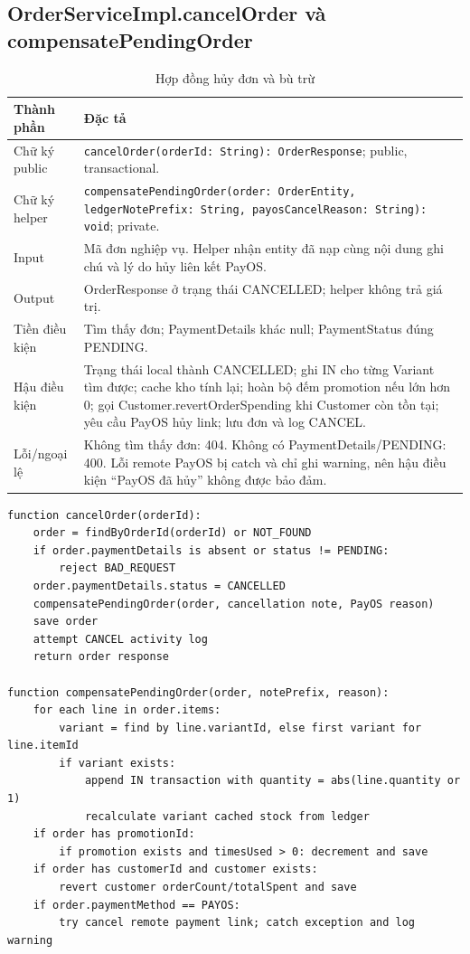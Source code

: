 \documentclass[12pt,a4paper,oneside]{report}
\begin{document}
\subsection{OrderServiceImpl.cancelOrder và compensatePendingOrder}
\begin{table}[htbp]
\centering\small
\caption{Hợp đồng hủy đơn và bù trừ}
\begin{tabularx}{\textwidth}{@{}p{3.1cm}Y@{}}\toprule
Thành phần & Đặc tả\\\midrule
Chữ ký public & \texttt{cancelOrder(orderId: String): OrderResponse}; public, transactional.\\
Chữ ký helper & \texttt{compensatePendingOrder(order: OrderEntity, ledgerNotePrefix: String, payosCancelReason: String): void}; private.\\
Input & Mã đơn nghiệp vụ. Helper nhận entity đã nạp cùng nội dung ghi chú và lý do hủy liên kết PayOS.\\
Output & OrderResponse ở trạng thái CANCELLED; helper không trả giá trị.\\
Tiền điều kiện & Tìm thấy đơn; PaymentDetails khác null; PaymentStatus đúng PENDING.\\
Hậu điều kiện & Trạng thái local thành CANCELLED; ghi IN cho từng Variant tìm được; cache kho tính lại; hoàn bộ đếm promotion nếu lớn hơn 0; gọi Customer.revertOrderSpending khi Customer còn tồn tại; yêu cầu PayOS hủy link; lưu đơn và log CANCEL.\\
Lỗi/ngoại lệ & Không tìm thấy đơn: 404. Không có PaymentDetails/PENDING: 400. Lỗi remote PayOS bị catch và chỉ ghi warning, nên hậu điều kiện “PayOS đã hủy” không được bảo đảm.\\
\bottomrule\end{tabularx}
\end{table}

\begin{lstlisting}[style=pseudo]
function cancelOrder(orderId):
    order = findByOrderId(orderId) or NOT_FOUND
    if order.paymentDetails is absent or status != PENDING:
        reject BAD_REQUEST
    order.paymentDetails.status = CANCELLED
    compensatePendingOrder(order, cancellation note, PayOS reason)
    save order
    attempt CANCEL activity log
    return order response

function compensatePendingOrder(order, notePrefix, reason):
    for each line in order.items:
        variant = find by line.variantId, else first variant for line.itemId
        if variant exists:
            append IN transaction with quantity = abs(line.quantity or 1)
            recalculate variant cached stock from ledger
    if order has promotionId:
        if promotion exists and timesUsed > 0: decrement and save
    if order has customerId and customer exists:
        revert customer orderCount/totalSpent and save
    if order.paymentMethod == PAYOS:
        try cancel remote payment link; catch exception and log warning
\end{lstlisting}
\end{document}
